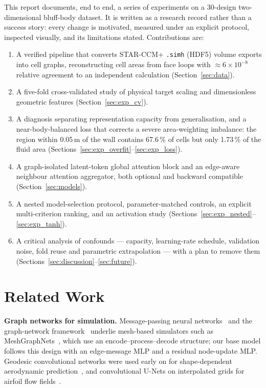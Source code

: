 \documentclass[journal]{IEEEtran}
\begin{document}
This report documents, end to end, a series of experiments on a 30-design
two-dimensional bluff-body dataset. It is written as a research record rather
than a success story: every change is motivated, measured under an explicit
protocol, inspected visually, and its limitations stated. Contributions are:
\begin{enumerate}
\item A verified pipeline that converts STAR-CCM+ \texttt{.simh} (HDF5) volume
exports into cell graphs, reconstructing cell areas from face loops with
$\approx\!6\times10^{-8}$ relative agreement to an independent calculation
(Section~\ref{sec:data}).
\item A five-fold cross-validated study of physical target scaling and
dimensionless geometric features (Section~\ref{sec:exp_cv}).
\item A diagnosis separating representation capacity from generalisation, and a
near-body-balanced loss that corrects a severe area-weighting imbalance:
the region within 0.05\,m of the wall contains 67.6\,\% of cells but only
1.73\,\% of the fluid area (Sections~\ref{sec:exp_overfit}--\ref{sec:exp_loss}).
\item A graph-isolated latent-token global attention block and an edge-aware
neighbour attention aggregator, both optional and backward compatible
(Section~\ref{sec:models}).
\item A nested model-selection protocol, parameter-matched controls, an explicit
multi-criterion ranking, and an activation study (Sections~\ref{sec:exp_nested}--\ref{sec:exp_tanh}).
\item A critical analysis of confounds --- capacity, learning-rate schedule,
validation noise, fold reuse and parametric extrapolation --- with a plan to
remove them (Sections~\ref{sec:discussion}--\ref{sec:future}).
\end{enumerate}

\section{Related Work}
\textbf{Graph networks for simulation.}
Message-passing neural networks~\cite{gilmer2017} and the graph-network
framework~\cite{battaglia2018} underlie mesh-based simulators such as
MeshGraphNets~\cite{pfaff2021}, which use an encode--process--decode structure; our base model follows this design with an edge-message MLP and a residual node-update MLP.
Geodesic convolutional networks were used early on for shape-dependent
aerodynamic prediction~\cite{baque2018}, and convolutional U-Nets on
interpolated grids for airfoil flow fields~\cite{thuerey2020}.
\end{document}
